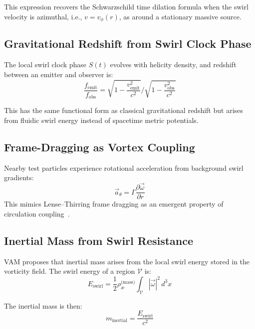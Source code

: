 \documentclass[preprint]{revtex4-2}
\begin{document}
    This expression recovers the Schwarzschild time dilation formula when the swirl velocity is azimuthal, i.e., $v = v_\phi(r)$, as around a stationary massive source.

    \subsection{Gravitational Redshift from Swirl Clock Phase}
    The local swirl clock phase $S(t)$ evolves with helicity density, and redshift between an emitter and observer is:
    \begin{equation}
        \frac{f_{\text{emit}}}{f_{\text{obs}}} = \sqrt{1 - \frac{v_{\text{emit}}^2}{c^2}} \bigg/ \sqrt{1 - \frac{v_{\text{obs}}^2}{c^2}}
        \label{eq:gravitational_redshift}
    \end{equation}

    This has the same functional form as classical gravitational redshift but arises from fluidic swirl energy instead of spacetime metric potentials.

    \subsection{Frame-Dragging as Vortex Coupling}
    Nearby test particles experience rotational acceleration from background swirl gradients:
    \begin{equation}
        \vec{a}_\theta = \Gamma \frac{\partial \vec{\omega}}{\partial r}
        \label{eq:frame_drag_accel}
    \end{equation}
    This mimics Lense–Thirring frame dragging as an emergent property of circulation coupling~\cite{thorne1986blackholes}.

    \subsection{Inertial Mass from Swirl Resistance}
    VAM proposes that inertial mass arises from the local swirl energy stored in the vorticity field. The swirl energy of a region $\mathcal{V}$ is:
    \begin{equation}
        E_{\text{swirl}} = \frac{1}{2} \rho_{\text{\ae}}^{\text{(mass)}} \int_{\mathcal{V}} |\vec{\omega}|^2 \, d^3x
        \label{eq:swirl_energy}
    \end{equation}

    The inertial mass is then:
    \begin{equation}
        m_{\text{inertial}} = \frac{E_{\text{swirl}}}{c^2}
        \label{eq:inertial_mass}
    \end{equation}
\end{document}
